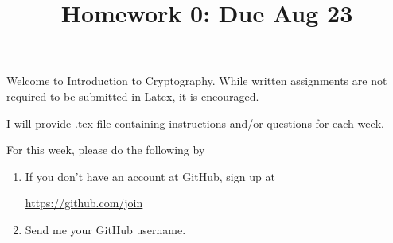 \documentclass[12pt]{amsart}
\theoremstyle{definition}
\begin{document}
\title{Homework 0: Due Aug 23}

\maketitle

Welcome to Introduction to Cryptography. While written assignments are not required to be
submitted in Latex, it is encouraged.

I will provide .tex file containing instructions and/or questions for each week.

For this week, please do the following by

\begin{enumerate}
	\item If you don't have an account at GitHub, sign up at
		\begin{center}
			\href{https://github.com/join}{https://github.com/join}
		\end{center}

	\item Send me your GitHub username.
\end{enumerate}
\end{document}
